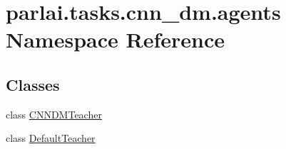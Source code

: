\hypertarget{namespaceparlai_1_1tasks_1_1cnn__dm_1_1agents}{}\section{parlai.\+tasks.\+cnn\+\_\+dm.\+agents Namespace Reference}
\label{namespaceparlai_1_1tasks_1_1cnn__dm_1_1agents}
\subsection*{Classes}
\begin{DoxyCompactItemize}
\item 
class \hyperlink{classparlai_1_1tasks_1_1cnn__dm_1_1agents_1_1CNNDMTeacher}{C\+N\+N\+D\+M\+Teacher}
\item 
class \hyperlink{classparlai_1_1tasks_1_1cnn__dm_1_1agents_1_1DefaultTeacher}{Default\+Teacher}
\end{DoxyCompactItemize}
